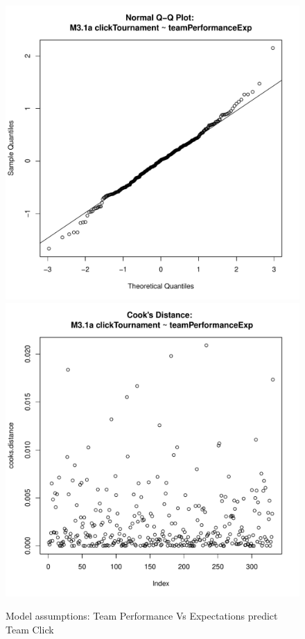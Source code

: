\begin{figure}[htbp]
   \includegraphics[scale =.4]{images/MLM31aQQNorm.pdf}
   \includegraphics[scale =.4]{images/MLM31aCooksD.pdf}
   \caption{Model assumptions: Team Performance Vs Expectations predict Team Click}
   \label{fig:MLM31aAssumptions}
 \end{figure}
















